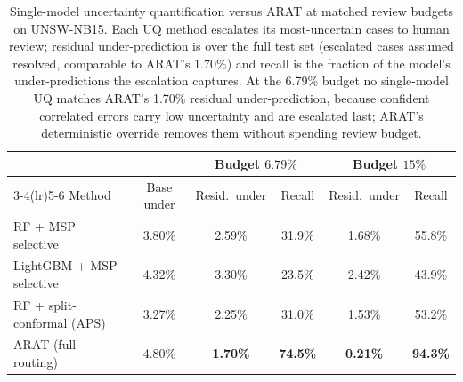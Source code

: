 \begin{table}[t]
\centering
\small
\setlength{\tabcolsep}{4.5pt}
\caption{Single-model uncertainty quantification versus ARAT at matched review budgets on UNSW-NB15. Each UQ method escalates its most-uncertain cases to human review; residual under-prediction is over the full test set (escalated cases assumed resolved, comparable to ARAT's 1.70\%) and recall is the fraction of the model's under-predictions the escalation captures. At the 6.79\% budget no single-model UQ matches ARAT's 1.70\% residual under-prediction, because confident correlated errors carry low uncertainty and are escalated last; ARAT's deterministic override removes them without spending review budget.}
\label{tab:uq}
\begin{tabular}{lccccc}
\toprule
& & \multicolumn{2}{c}{Budget $6.79\%$} & \multicolumn{2}{c}{Budget $15\%$} \\
\cmidrule(lr){3-4}\cmidrule(lr){5-6}
Method & Base under & Resid.\ under & Recall & Resid.\ under & Recall \\
\midrule
RF + MSP selective & 3.80\% & 2.59\% & 31.9\% & 1.68\% & 55.8\% \\
LightGBM + MSP selective & 4.32\% & 3.30\% & 23.5\% & 2.42\% & 43.9\% \\
RF + split-conformal (APS) & 3.27\% & 2.25\% & 31.0\% & 1.53\% & 53.2\% \\
\midrule
ARAT (full routing) & 4.80\% & \textbf{1.70\%} & \textbf{74.5\%} & \textbf{0.21\%} & \textbf{94.3\%} \\
\bottomrule
\end{tabular}
\end{table}